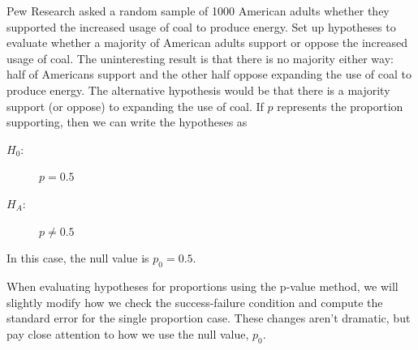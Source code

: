 \begin{example}{Pew Research asked a random sample of 1000 American
    adults whether they supported the increased usage of coal to
    produce energy.
    Set up hypotheses to evaluate whether
    a majority of American adults support or oppose
    the increased usage of coal.}
  The uninteresting result is that there is no majority either way:
  half of Americans support and the other half oppose expanding the
  use of coal to produce energy. The alternative hypothesis would
  be that there is a majority support (or oppose) to expanding the
  use of coal. If $p$ represents the proportion supporting, then
  we can write the hypotheses as
  \begin{description}
    \item[$H_0$:] $p = 0.5$
    \item[$H_A$:] $p \neq 0.5$
  \end{description}
  In this case, the null value is $p_0 = 0.5$.
\end{example}

\newcommand{\pewcoalpollsize}{1000}
\newcommand{\pewcoalpollprop}{0.370}
\newcommand{\pewcoalpollpropcomplement}{0.630}
\newcommand{\pewcoalpollpercent}{37.0}
\newcommand{\pewcoalpollpercentcomplement}{63.0}
\newcommand{\pewcoalpollcount}{370}
\newcommand{\pewcoalpollcountcomplement}{630}
\newcommand{\pewcoalpollse}{0.0153}
\newcommand{\pewcoalpollnullvalue}{0.5}
\newcommand{\pewcoalpollnullse}{0.016}

When evaluating hypotheses for proportions using the
p-value method,
we will slightly modify how we check the success-failure
condition and compute the standard error for the
single proportion case.
These changes aren't dramatic, but pay close attention
to how we use the null value, $p_0$.

